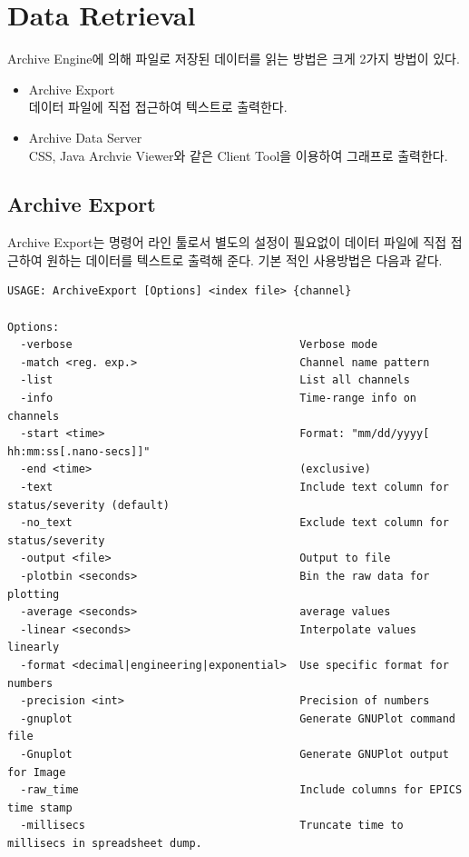 \documentclass[11pt
  , a4paper
  , article
  , oneside
]{memoir}
\begin{document}
\chapter{Data Retrieval}
Archive Engine에 의해 파일로 저장된 데이터를 읽는 방법은 크게 2가지 방법이 있다.
\begin{itemize}
\item Archive Export\\
데이터 파일에 직접 접근하여 텍스트로 출력한다.
\item Archive Data Server\\
CSS, Java Archvie Viewer와 같은 Client Tool을 이용하여 그래프로 출력한다.
\end{itemize}
\section{Archive Export}
Archive Export는 명령어 라인 툴로서 별도의 설정이 필요없이 데이터 파일에 직접 접근하여
원하는 데이터를 텍스트로 출력해 준다. 기본 적인 사용방법은 다음과 같다.
\begin{lstlisting}[style=termstyle]
USAGE: ArchiveExport [Options] <index file> {channel}

Options:
  -verbose                                   Verbose mode
  -match <reg. exp.>                         Channel name pattern
  -list                                      List all channels
  -info                                      Time-range info on channels
  -start <time>                              Format: "mm/dd/yyyy[ hh:mm:ss[.nano-secs]]"
  -end <time>                                (exclusive)
  -text                                      Include text column for status/severity (default)
  -no_text                                   Exclude text column for status/severity
  -output <file>                             Output to file
  -plotbin <seconds>                         Bin the raw data for plotting
  -average <seconds>                         average values
  -linear <seconds>                          Interpolate values linearly
  -format <decimal|engineering|exponential>  Use specific format for numbers
  -precision <int>                           Precision of numbers
  -gnuplot                                   Generate GNUPlot command file
  -Gnuplot                                   Generate GNUPlot output for Image
  -raw_time                                  Include columns for EPICS time stamp
  -millisecs                                 Truncate time to millisecs in spreadsheet dump.

\end{lstlisting}
\end{document}
